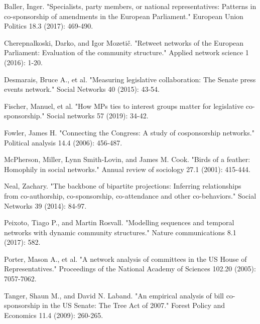 \documentclass[lettersize,journal]{IEEEtran}
\begin{document}
\begin{thebibliography}{1}


Baller, Inger. "Specialists, party members, or national representatives: Patterns in co-sponsorship of amendments in the European Parliament." European Union Politics 18.3 (2017): 469-490.

Cherepnalkoski, Darko, and Igor Mozetič. "Retweet networks of the European Parliament: Evaluation of the community structure." Applied network science 1 (2016): 1-20.

Desmarais, Bruce A., et al. "Measuring legislative collaboration: The Senate press events network." Social Networks 40 (2015): 43-54.

Fischer, Manuel, et al. "How MPs ties to interest groups matter for legislative co-sponsorship." Social networks 57 (2019): 34-42.

Fowler, James H. "Connecting the Congress: A study of cosponsorship networks." Political analysis 14.4 (2006): 456-487.

McPherson, Miller, Lynn Smith-Lovin, and James M. Cook. "Birds of a feather: Homophily in social networks." Annual review of sociology 27.1 (2001): 415-444.

Neal, Zachary. "The backbone of bipartite projections: Inferring relationships from co-authorship, co-sponsorship, co-attendance and other co-behaviors." Social Networks 39 (2014): 84-97.

Peixoto, Tiago P., and Martin Rosvall. "Modelling sequences and temporal networks with dynamic community structures." Nature communications 8.1 (2017): 582.

Porter, Mason A., et al. "A network analysis of committees in the US House of Representatives." Proceedings of the National Academy of Sciences 102.20 (2005): 7057-7062.

Tanger, Shaun M., and David N. Laband. "An empirical analysis of bill co-sponsorship in the US Senate: The Tree Act of 2007." Forest Policy and Economics 11.4 (2009): 260-265.

\end{thebibliography}


\vfill
\end{document}
